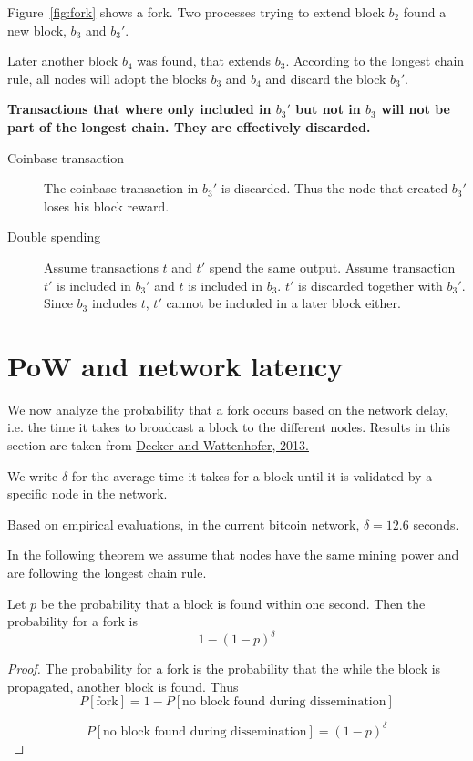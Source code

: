 \begin{example}
	Figure~\ref{fig:fork} shows a fork. Two processes trying to extend block $b_2$ found a new block, $b_3$ and $b_3'$.
	
	Later another block $b_4$ was found, that extends $b_3$.
	According to the longest chain rule, all nodes will adopt the blocks $b_3$ and $b_4$ and discard the block $b_3'$.
	
	\textbf{Transactions that where only included in $b_3'$ but not in $b_3$ will not be part of the longest chain. They are effectively discarded.}
	\begin{description}
		\item[Coinbase transaction] The coinbase transaction in $b_3'$ is discarded. Thus the node that created $b_3'$ loses his block reward.
		\item[Double spending] Assume transactions $t$ and $t'$ spend the same output. Assume transaction $t'$ is included in $b_3'$ and $t$ is included in $b_3$. $t'$ is discarded together with $b_3'$. Since $b_3$ includes $t$, $t'$ cannot be included in a later block either.
	\end{description}
	
	 
\end{example}

\section{PoW and network latency}
\label{sec:fork}

We now analyze the probability that a fork occurs based on the network delay, i.e. the time it takes to broadcast a block to the different nodes.
Results in this section are taken from \href{https://www.gsd.inesc-id.pt/~ler/docencia/rcs1314/papers/P2P2013_041.pdf}{Decker and Wattenhofer, 2013.}

\begin{definition}
	We write $\delta$ for the average time it takes for a block until it is validated by a specific node in the network.
\end{definition}

\begin{note} Based on empirical evaluations, in the current bitcoin network, $\delta=12.6$ seconds. 
\end{note}

In the following theorem we assume that nodes have the same mining power and are following the longest chain rule.
\begin{theorem}
	\label{thm:fork}
	Let $p$ be the probability that a block is found within one second.
	Then the probability for a fork is
	\[
		1-(1-p)^\delta
	\]
\end{theorem}
\begin{proof}
The probability for a fork is the probability that the while the block is propagated, another block is found.
Thus $$P[\text{fork}] = 1- P[\text{no block found during dissemination}]$$

$$P[\text{no block found during dissemination}] = (1-p)^\delta$$
\end{proof}

